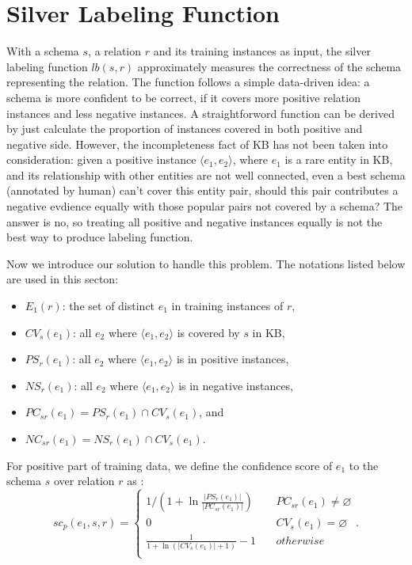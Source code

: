 \section{Silver Labeling Function}
\label{sec:label}

With a schema $s$, a relation $r$ and its training instances as 
input, the silver labeling function $lb(s, r)$ approximately 
measures the correctness of the schema representing the relation.
The function follows a simple data-driven idea: a schema is more
confident to be correct, if it covers more positive relation 
instances and less negative instances. 
A straightforword function can be derived by just calculate the 
proportion of instances covered in both positive and negative side.
However, the incompleteness fact of KB has not been taken into 
consideration: given a positive instance $\langle e_1, e_2 \rangle$,
where $e_1$ is a rare entity in KB, and its relationship with other
entities are not well connected, even a best schema (annotated by 
human) can't cover this entity pair, should this pair contributes
a negative evdience equally with those popular pairs not covered by
a schema?
The answer is no, so treating all positive and negative instances 
equally is not the best way to produce labeling function.

Now we introduce our solution to handle this problem.
The notations listed below are used in this secton:
\begin{itemize}
  \item $E_1(r)$: the set of distinct $e_1$ in training instances of $r$,
  \item $CV_s(e_1)$: all $e_2$ where $\langle e_1, e_2 \rangle$ is covered by $s$ in KB, 
  \item $PS_r(e_1)$: all $e_2$ where $\langle e_1, e_2 \rangle$ is in positive instances,
  \item $NS_r(e_1)$: all $e_2$ where $\langle e_1, e_2 \rangle$ is in negative instances,
  \item $PC_{sr}(e_1) = PS_r(e_1) \cap CV_s(e_1)$, and
  \item $NC_{sr}(e_1) = NS_r(e_1) \cap CV_s(e_1)$.
\end{itemize}

For positive part of training data, we define the confidence score 
of $e_1$ to the schema $s$ over relation $r$ as 
:
\begin{equation}
\label{eqn:scp}
  sc_p(e_1, \! s, \! r) \! = \! \left\{
  	\begin{aligned}
	\! 1 / ( 1 \! + \! \ln \frac 
	  {\left| PS_r(e_1) \right|} 
	  {\left| PC_{sr}(e_1) \right|} 
	)    & ~ & PC_{sr}(e_1) \! \neq \! \varnothing  \\
	\! 0 & ~ & CV_s(e_1) \! = \! \varnothing        \\
	\! \frac {1} {
	  1 \! + \! \ln (\left| CV_s(e_1) \right| \! + \! 1)
	} \! - \! 1  & ~ & otherwise    \\
	\end{aligned}
  \right..
\end{equation}


